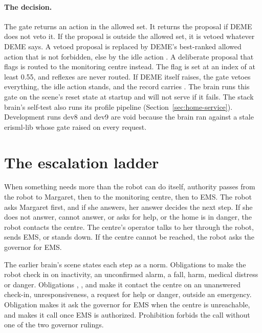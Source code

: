 \paragraph{The decision.} The gate returns an action in the allowed set. It returns the proposal if
DEME does not veto it. If the proposal is outside the allowed set, it is vetoed whatever DEME says. A
vetoed proposal is replaced by DEME's best-ranked allowed action that is not forbidden, else by the
idle action . A deliberate proposal that  flags is
routed to the monitoring centre instead. The flag is set at an index of at least 0.55, and reflexes
are never routed. If DEME itself raises, the gate vetoes everything, the idle action stands, and the
record carries . The brain runs this gate on the scene's reset state at startup and
will not serve if it fails. The stack brain's self-test also runs its profile pipeline
(Section~\ref{sec:home-service}). Development runs dev8 and dev9 are void because the brain ran
against a stale erisml-lib whose gate raised on every request.

\section{The escalation ladder}\label{sec:cont-ladder}

When something needs more than the robot can do itself, authority passes from the robot to Margaret,
then to the monitoring centre, then to EMS. The robot asks Margaret first, and if she answers, her
answer decides the next step. If she does not answer, cannot answer, or asks for help, or the home is
in danger, the robot contacts the centre. The centre's operator talks to her through the robot,
sends EMS, or stands down. If the centre cannot be reached, the robot asks the governor for EMS.

The earlier brain's scene states each step as a norm. Obligations  to  make the robot check in on
inactivity, an unconfirmed alarm, a fall, harm, medical distress or danger. Obligations ,
,  and  make it contact the centre on an unanswered check-in,
unresponsiveness, a request for help or danger, outside an emergency. Obligation  makes it
ask the governor for EMS when the centre is unreachable, and  makes it call once EMS is
authorized. Prohibition  forbids the call without one of the two governor rulings.

